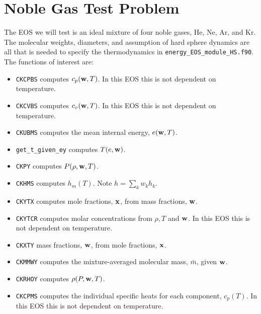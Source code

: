 \documentclass[final]{siamltex}
\def\wb {{\bf w}}
\def\xb {{\bf x}}
\begin{document}
\section{Noble Gas Test Problem}

The EOS we will test is an ideal mixture of four noble gases, 
He, Ne, Ar, and Kr.
The molecular weights, diameters, and assumption of hard sphere dynamics
 are all that is needed to specify the thermodynamics in
{\tt energy\_EOS\_module\_HS.f90}.  The functions of interest are:\\
\begin{itemize}

\item {\tt CKCPBS} computes $c_p(\wb,T)$.  In this EOS this is not dependent on temperature.\\

\item {\tt CKCVBS} computes $c_v(\wb,T)$.  In this EOS this is not dependent on temperature.\\

\item {\tt CKUBMS} computes the mean internal energy, $e(\wb,T)$.\\

\item {\tt get\_t\_given\_ey} computes $T(e,\wb)$.\\

\item {\tt CKPY} computes $P(\rho,\wb,T)$.\\

\item {\tt CKHMS} computes $h_m(T)$.  Note $h = \sum_k w_k h_k$.\\

\item {\tt CKYTX} computes mole fractions, $\xb$, from mass fractions, $\wb$.\\

\item {\tt CKYTCR} computes molar concentrations from $\rho,T$ and $\wb$.
In this EOS this is not dependent on temperature.\\

\item {\tt CKXTY} mass fractions, $\wb$, from mole fractions, $\xb$.\\

\item {\tt CKMMWY} computes the mixture-averaged molecular mass, $\bar{m}$, given $\wb$.\\

\item {\tt CKRHOY} computes $\rho(P,\wb,T)$.\\

\item {\tt CKCPMS} computes the individual specific heats for each component,
$c_p(T)$.  In this EOS this is not dependent on temperature.\\

\end{itemize}
\end{document}
